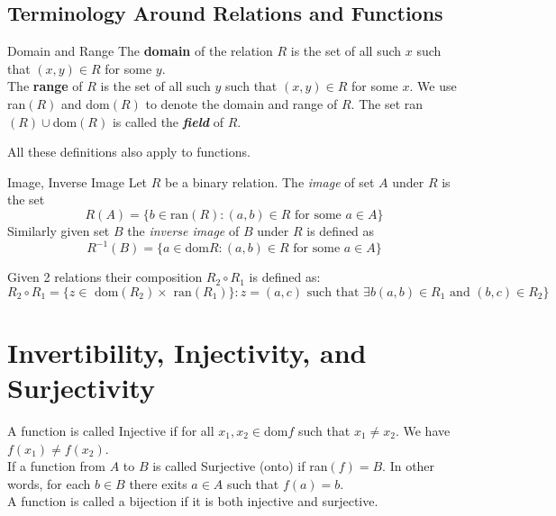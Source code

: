 \documentclass[16pt,a4paper]{article}
\theoremstyle{definition}
\begin{document}
\subsection{Terminology Around Relations and Functions}
\begin{defn}{Domain and Range}{}
The \textbf{domain} of the relation $R$ is the set of all such $x$ such that $(x,y)\in R$ for some $y$. \\
The \textbf{range} of $R$ is the set of all such $y$ such that $(x,y)\in R$ for some $x$. 
We use ran$(R)$ and dom$(R)$ to denote the domain and range of $R$. 
The set ran$(R)\cup$dom$(R)$ is called the \textbf{\textit{\emph{field}}} of $R$.  
\end{defn}
All these definitions also apply to functions. 
\begin{defn}{Image, Inverse Image}{}
Let $R$ be a binary relation. The \textit{image} of set $A$ under $R$ is the set
\[R(A) = \{b\in \text{ran}(R) : (a,b) \in R \text{ for some } a\in A\}\]
Similarly given set $B$ the \textit{inverse image} of $B$ under $R$ is defined as
\[R^{-1} (B) = \{a\in \text{dom$R$} : (a,b)\in R \text{ for some $a\in A$}\}\]
\end{defn}
Given 2 relations their composition $R_2\circ R_1$ is defined as:
\[R_2 \circ R_1 = \{z\in \text{ dom$(R_2)\times$ ran$(R_1)$}\} : z = (a,c) \text{ such that $\exists b (a,b) \in R_1$ and $(b,c)\in R_2$}\}\]

\section{Invertibility, Injectivity, and Surjectivity}
A function is called Injective if for all $x_1, x_2 \in $dom$f$ such that $x_1 \neq x_2$. We have $f(x_1) \neq f(x_2)$. \\

If a function from $A$ to $B$ is called Surjective (onto) if ran$(f) = B$. In other words, for each $b\in B$ there exits $a\in A$ such that $f(a) = b$. \\

A function is called a bijection if it is both injective and surjective. 
\begin{figure}[hbpt]
\center
{}
\end{figure}
\end{document}
